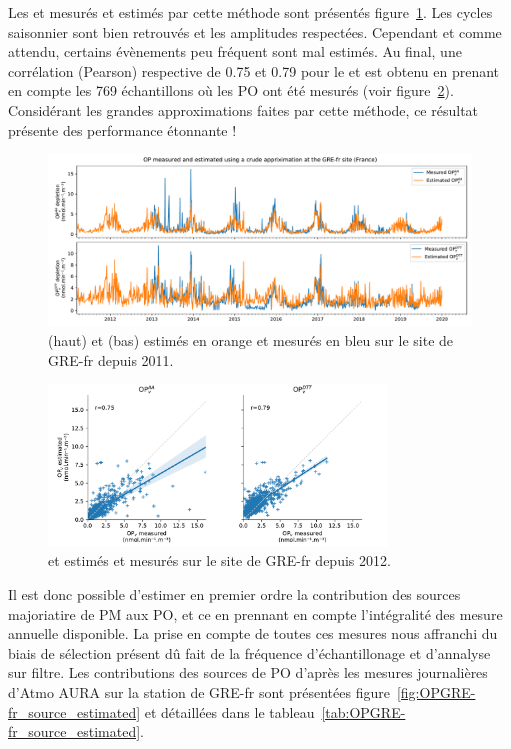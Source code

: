 Les \POAAv{} et \PODTTv{} mesurés et estimés par cette méthode sont présentés
figure~\ref{fig:OPGRE-fr-estimated}.  Les cycles saisonnier sont bien retrouvés et les
amplitudes respectées. Cependant et comme attendu, certains évènements peu fréquent sont
mal estimés. Au final, une corrélation (Pearson) respective de 0.75 et 0.79 pour le
\POAAv{} et \PODTTv{} est obtenu en prenant en compte les 769 échantillons où les PO ont
été mesurés (voir figure~\ref{fig:OPGRE-fr-estimated_scatter}).  Considérant les grandes
approximations faites par cette méthode, ce résultat présente des performance étonnante !

\begin{figure}[ht]
    \centering
    \includegraphics[width=1.0\textwidth]{figures/chapter05/OPGRE-fr_estimated.pdf}
    \caption{\POAAv{} (haut) et \PODTTv{} (bas) estimés en orange et mesurés en bleu sur le site de GRE-fr depuis 2011.}
    \label{fig:OPGRE-fr-estimated}
\end{figure}
 
\begin{figure}[ht]
    \centering
    \includegraphics[width=0.8\textwidth]{figures/chapter05/OPGRE-fr_estimated_scatter.pdf}
    \caption{\POAAv{} et \PODTTv{} estimés et mesurés sur le site de GRE-fr depuis 2012.}
    \label{fig:OPGRE-fr-estimated_scatter}
\end{figure}


Il est donc possible d'estimer en premier ordre la contribution des sources majoriatire de
PM aux PO, et ce en prennant en compte l'intégralité des mesure annuelle disponible. La
prise en compte de toutes ces mesures nous affranchi du biais de sélection présent dû
fait de la fréquence d'échantillonage et d'annalyse sur filtre. Les contributions des
sources de PO d'après les mesures journalières d'Atmo AURA sur la station de GRE-fr sont
présentées figure~\ref{fig:OPGRE-fr_source_estimated} et détaillées dans le
tableau~\ref{tab:OPGRE-fr_source_estimated}.

